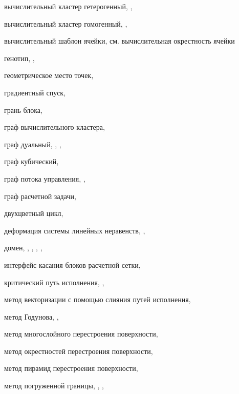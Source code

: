 вычислительный кластер гетерогенный, \pageref{term:cluster_getero}, \pageref{term:cluster_getero2}

вычислительный кластер гомогенный, \pageref{term:cluster_gomo}, \pageref{term:cluster_gomo2}

вычислительный шаблон ячейки, см. вычислительная окрестность ячейки

генотип, \pageref{term:genotype}, \pageref{term:genotype2}

геометрическое место точек, \pageref{term:gmt}

градиентный спуск, \pageref{term:gradient_spusk}

грань блока, \pageref{term:block_facet}

граф вычислительного кластера, \pageref{term:graph_cluster}

граф дуальный, \pageref{term:dual_graph}, \pageref{term:dual_graph2}, \pageref{term:dual_graph3}

граф кубический, \pageref{term:graph_cubic}

граф потока управления, \pageref{term:graph_cfg}, \pageref{term:graph_cfg2}

граф расчетной задачи, \pageref{term:graph_task}

двухцветный цикл, \pageref{term:bicolor_cycle}

деформация системы линейных неравенств, \pageref{term:deform_sys_lin_neravenstv}, \pageref{term:deform_sys_lin_neravenstv2}

домен, \pageref{term:domain}, \pageref{term:domain2}, \pageref{term:domain3}, \pageref{term:domain4}, \pageref{term:domain5}

интерфейс касания блоков расчетной сетки, \pageref{term:block_interface}

критический путь исполнения, \pageref{term:critical_path}, \pageref{term:critical_path2}

метод векторизации с помощью слияния путей исполнения, \pageref{term:meth_vec_merge}

метод Годунова, \pageref{term:godunov_method}, \pageref{term:godunov_method2}

метод многослойного перестроения поверхности, \pageref{term:method_remesh_multi}

метод окрестностей перестроения поверхности, \pageref{term:method_remesh_okr}

метод пирамид перестроения поверхности, \pageref{term:method_remesh_pyramid}

метод погруженной границы, \pageref{term:immersed_boundary_method}, \pageref{term:immersed_boundary_method2}, \pageref{term:immersed_boundary_method3}

